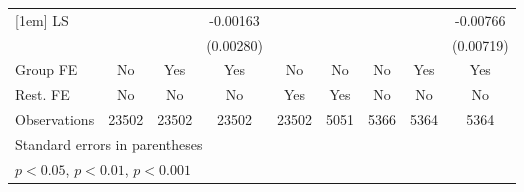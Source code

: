 {\begin{tabular}{l*{8}{c}}
[1em]
LS                  &                     &                     &    -0.00163         &                     &                     &                     &                     &    -0.00766    \\
                    &                     &                     &   (0.00280)         &                     &                      &                     &                     &   (0.00719)  \\
\hline
Group FE        &       No         &       Yes         &       Yes         &       No         &        No         & No & Yes & Yes\\
Rest. FE        &       No         &       No         &       No         &       Yes         &        Yes        & No & No & No\\
Observations        &       23502         &       23502         &       23502         &       23502         &        5051       &        5366         &        5364         &        5364        \\
\hline\hline
\multicolumn{6}{l}{\footnotesize Standard errors in parentheses}\\
\multicolumn{6}{l}{\footnotesize \sym{*} \(p<0.05\), \sym{**} \(p<0.01\), \sym{***} \(p<0.001\)}\\
\end{tabular}
}
